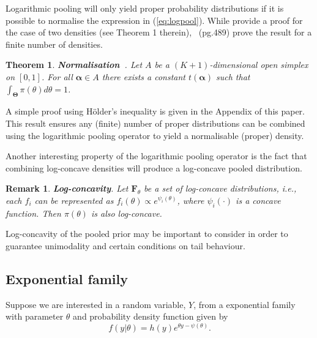 \documentclass[a4paper, notitlepage, 10pt]{article}
\newtheorem{theo}{Theorem}[]
\newtheorem{remark}{Remark}[]
\begin{document}
Logarithmic pooling will only yield proper probability distributions if it is possible to normalise the expression in (\ref{eq:logpool}).
While \citet{poole2000} provide a proof for the case of two densities (see Theorem 1 therein),~\cite{genest1986A} (pg.489) prove the result for a finite number of densities.
\begin{theo}
\label{thm:normalisation}
\textbf{Normalisation~\citep{genest1986A}}. 
Let $A$ be a $(K+1)$-dimensional open simplex on $[0,1]$.
For all $\boldsymbol\alpha \in A$ there exists a constant $t(\boldsymbol\alpha)$ such that $\int_{\boldsymbol\Theta}\pi(\theta)d\theta = 1$.
\end{theo}
A simple proof using H\"{o}lder's inequality is given in the Appendix of this paper.
This result ensures any (finite) number of proper distributions can be combined using the logarithmic pooling operator to yield a normalisable (proper) density.

Another interesting property of the logarithmic pooling operator is the fact that combining log-concave densities will produce a log-concave pooled distribution.
\begin{remark}
\label{rmk:concavity}
\textbf{Log-concavity}. 
 Let $\mathbf{F}_{\theta}$ be a set of log-concave distributions, i.e., each $f_i$ can be represented as $ f_i(\theta) \propto e^{\psi_i(\theta)}$,
where $\psi_i(\cdot)$ is a concave function.
Then $\pi(\theta)$ is also log-concave.
\end{remark}

Log-concavity of the pooled prior may be important to consider in order to guarantee unimodality and certain conditions on tail behaviour.

\subsection*{Exponential family}

Suppose we are interested in a random variable, $Y$, from a exponential family with parameter $\theta$ and probability density function given by
\begin{equation}
\label{eq:exponentialfamily}
f(y|\theta) = h(y) e^{\theta y - \psi(\theta)}.
\end{equation}
\end{document}
